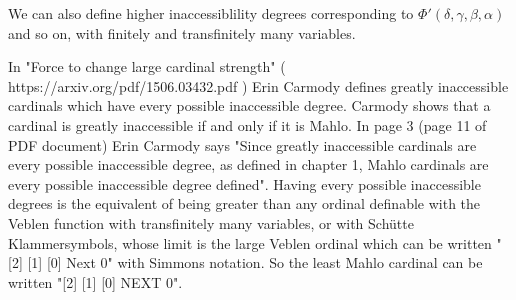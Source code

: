 \documentclass[10pt]{article}
\begin{document}
We can also define higher inaccessiblility degrees corresponding to \( \Phi'(\delta,\gamma,\beta,\alpha) \) and so on, with finitely and transfinitely many variables.


\bigskip

In "Force to change large cardinal strength" ( https://arxiv.org/pdf/1506.03432.pdf ) Erin Carmody defines greatly inaccessible cardinals which have every possible inaccessible degree.
Carmody shows that a cardinal is greatly inaccessible if and only if it is Mahlo. 
In  page 3 (page 11 of PDF document) Erin Carmody says "Since greatly
inaccessible cardinals are every possible inaccessible degree, as defined in chapter 1, Mahlo
cardinals are every possible inaccessible degree defined".
Having every possible inaccessible degrees is the equivalent of being greater than any ordinal definable with the Veblen function with transfinitely many variables, or with Schütte Klammersymbols, whose limit is the large Veblen ordinal which can be written "[2] [1] [0] Next 0" with Simmons notation. 
So the least Mahlo cardinal can be written "[2] [1] [0] NEXT 0".

\begin{comment}
In  page 3 of "Force to change large cardinal strength" ( https://arxiv.org/pdf/1506.03432.pdf ) (page 11 of PDF document) Erin Carmody says "Since greatly
inaccessible cardinals are every possible inaccessible degree, as defined in chapter 1, Mahlo
cardinals are every possible inaccessible degree defined", every possible inaccessible degree being the equivalent of Veblen function with transfinitely many variables, or Schütte Klammersymbols, whose limit is the large Veblen ordinal, written [2] [1] [0] Next 0, so the least Mahlo cardinal can be written [2] [1] [0] NEXT 0.
\end{comment}
\end{document}
